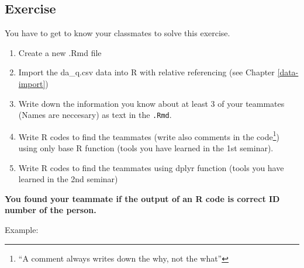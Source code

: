 \documentclass[
]{article}
\begin{document}
\hypertarget{exercise}{%
\subsection{Exercise}\label{exercise}}

You have to get to know your classmates to solve this exercise.

\begin{enumerate}
\def\labelenumi{\arabic{enumi}.}
\item
  Create a new .Rmd file
\item
  Import the da\_q.csv data into R with relative referencing (see Chapter \ref{data-import})
\item
  Write down the information you know about at least 3 of your teammates (Names are neccesary) as text in the \texttt{.Rmd}.
\item
  Write R codes to find the teammates (write also comments in the code\footnote{``A comment always writes down the why, not the what''}) using only base R function (tools you have learned in the 1st seminar).
\item
  Write R codes to find the teammates using dplyr function (tools you have learned in the 2nd seminar)
\end{enumerate}

\textbf{You found your teammate if the output of an R code is correct ID number of the person.}

Example:
\end{document}
